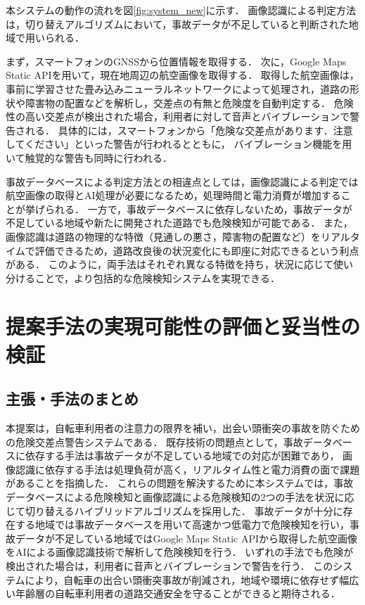 \documentclass[uplatex,dvipdfmx]{jsarticle}
\begin{document}
本システムの動作の流れを図\ref{fig:system_new}に示す．
画像認識による判定方法は，切り替えアルゴリズムにおいて，事故データが不足していると判断された地域で用いられる．

まず，スマートフォンのGNSSから位置情報を取得する．
次に，Google Maps Static APIを用いて，現在地周辺の航空画像を取得する．
取得した航空画像は，事前に学習させた畳み込みニューラルネットワークによって処理され，道路の形状や障害物の配置などを解析し，交差点の有無と危険度を自動判定する．
危険性の高い交差点が検出された場合，利用者に対して音声とバイブレーションで警告される．
具体的には，スマートフォンから「危険な交差点があります．注意してください」といった警告が行われるとともに，
バイブレーション機能を用いて触覚的な警告も同時に行われる．

事故データベースによる判定方法との相違点としては，画像認識による判定では航空画像の取得とAI処理が必要になるため，処理時間と電力消費が増加することが挙げられる．
一方で，事故データベースに依存しないため，事故データが不足している地域や新たに開発された道路でも危険検知が可能である．
また，画像認識は道路の物理的な特徴（見通しの悪さ，障害物の配置など）をリアルタイムで評価できるため，道路改良後の状況変化にも即座に対応できるという利点がある．
このように，両手法はそれぞれ異なる特徴を持ち，状況に応じて使い分けることで，より包括的な危険検知システムを実現できる．

\section{提案手法の実現可能性の評価と妥当性の検証}

\subsection{主張・手法のまとめ}
本提案は，自転車利用者の注意力の限界を補い，出会い頭衝突の事故を防ぐための危険交差点警告システムである．
既存技術の問題点として，事故データベースに依存する手法は事故データが不足している地域での対応が困難であり，
画像認識に依存する手法は処理負荷が高く，リアルタイム性と電力消費の面で課題があることを指摘した．
これらの問題を解決するために本システムでは，事故データベースによる危険検知と画像認識による危険検知の2つの手法を状況に応じて切り替えるハイブリッドアルゴリズムを採用した．
事故データが十分に存在する地域では事故データベースを用いて高速かつ低電力で危険検知を行い，事故データが不足している地域ではGoogle Maps Static APIから取得した航空画像をAIによる画像認識技術で解析して危険検知を行う．
いずれの手法でも危険が検出された場合は，利用者に音声とバイブレーションで警告を行う．
このシステムにより，自転車の出合い頭衝突事故が削減され，地域や環境に依存せず幅広い年齢層の自転車利用者の道路交通安全を守ることができると期待される．
\end{document}
